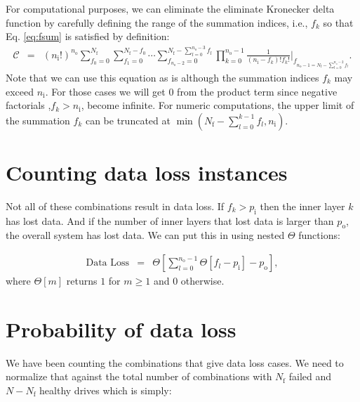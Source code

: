 \documentclass[journal]{IEEEtran}
\begin{document}
For computational purposes, we can eliminate the eliminate Kronecker delta function by carefully defining the range of the summation indices, i.e., \(f_k\) so that Eq. \eqref{eq:fsum} is satisfied by definition:
\begin{eqnarray}
\mathcal{C}&=& \left(n_\text{i}!\right)^{n_\text{o}}  \sum_{f_0=0}^{N_\text{f}}\sum_{f_1=0}^{N_\text{f}-f_0}\cdots \sum_{f_{n_\text{o}-2}=0}^{N_\text{f}-\sum_{l=0}^{n_\text{o}-3}f_l} {\displaystyle \prod_{k=0}^{n_\text{o}-1}} \frac{1}{(n_\text{i}-f_k)!f_k!}\bigg\rvert_{f_{ n_\text{o}-1=N_\text{f}-\sum_{l=0}^{n_\text{o}-2}f_l}}.
\label{eq:tcfs2}
\end{eqnarray}
Note that we can use this equation as is although the summation indices \(f_k\) may exceed \(n_\text{i}\). For those cases we will get \(0\) from the product term since negative factorials ,\(f_k>n_\text{i}\), become infinite. For numeric computations, the upper limit of the summation \(f_k\) can be truncated at \(\min(N_\text{f}-\sum_{l=0}^{k-1}f_l, n_\text{i})\).

\hypertarget{counting-data-loss-instances}{%
\section{Counting data loss instances}\label{counting-data-loss-instances}}

Not all of these combinations result in data loss. If \(f_k>p_\text{i}\) then the inner layer \(k\) has lost data. And if the number of inner layers that lost data is larger than \(p_\text{o}\), the overall system has lost data. We can put this in using nested \(\Theta\) functions:

\begin{eqnarray}
\text{Data Loss}&=& \Theta\left[  \sum_{l=0}^{n_\text{o}-1}  \Theta \left[f_l-p_\text{i} \right]-p_\text{o}     \right],
\label{eq:theta}
\end{eqnarray}
where \(\Theta[m]\) returns \(1\) for \(m\geq 1\) and \(0\) otherwise.

\hypertarget{probability-of-data-loss}{%
\section{Probability of data loss}\label{probability-of-data-loss}}

We have been counting the combinations that give data loss cases. We need to normalize that against the total number of combinations with \(N_\text{f}\) failed and \(N-N_\text{f}\) healthy drives which is simply:
\end{document}
